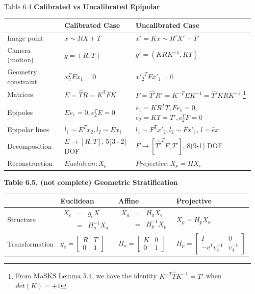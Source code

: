 \documentclass{../cheat}
\begin{document}
\begin{tables}
\begin{multicols}{2}
		Table 6.4
	\textbf{Calibrated vs Uncalibrated Epipolar}\\
	\begin{tabularx}{\columnwidth}{| l | l | X |}
	\hline
	& \textbf{Calibrated Case} & \textbf{Uncalibrated Case} \\ \hline \hline
	Image point & $x \sim R X+T$ & $x'=Kx \sim R'X'+T'$ \\ \hline
	Camera (motion) & $g=(R,T)$ & $g'=(KRK^{-1}, KT)$ \\ \hline
	Geometry constraint & $x_2^T E x_1=0$ & ${x'_2}^T F x'_1=0$ \\ \hline
	Matrices & $E=\widehat{T}R=K^T FK$ & $F=\widehat{T'}R'=K^{-T}E K^{-1}=\widehat{T'}KRK^{-1}$
		\footnote{From MaSKS Lemma 5.4, we have the identity $K^{-T} \widehat{T}K^{-1}=\widehat{T'}$ when $det(K) = +1$} \\ \hline
	Epipoles & $Ee_1=0, e_2^T E=0$ & $e_1=KR^T T, Fe_1=0$,\newline $e_2=KT=T', e_2^T F=0$ \\ \hline
	Epipolar lines & $l_1\sim E^T x_2, l_2\sim E x_1$ & $l_1\sim F^T x'_2, l_2\sim F x'_1$,
	 $l=\widehat{e}x$ \\ \hline
	Decomposition & $E \rightarrow [R, T]$, 5(3+2) DOF & $F \rightarrow [\widehat{T'}^TF, T']$, 8(9-1) DOF \\ \hline
	Reconstruction & $Euclidean: X_e$ & $Projective: X_p=H X_e$ \\ \hline
	\end{tabularx}

	

	\textbf{Table 6.5. (not complete) Geometric Stratification}\\


	\begin{tabularx}{\columnwidth}{| l | p{21mm} | p{27mm}	 | X |}
		\hline
		& \textbf{Euclidean} & \textbf{Affine} & \textbf{Projective} \\ \hline \hline
	
		Structure & $\begin{array}{lcl}
	 		X_e &=& g_e X\\
			&=&H_a^{-1}X_a
			\end{array}$ 
		& $\begin{array}{lcl}
			X_a &=& H_a X_e\\
			&=& H_p^{-1}X_p
			\end{array}$
		  & $X_p=H_p X_a$\\ \hline
		
		Transformation &  $g_e=\begin{bmatrix}	R & T \\ 0 &  1 \end{bmatrix}$ &
		$H_a=\begin{bmatrix} K & 0 \\ 0 &  1	\end{bmatrix}$ &
		$H_p=\begin{bmatrix} I & 0 \\ -v^T v_4^{-1} &  v_4^{-1}\end{bmatrix}$ \\ \hline
		

\end{tabularx}
\end{multicols}
\end{tables}
\end{document}
